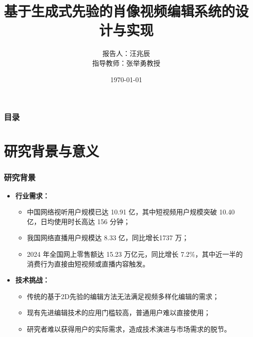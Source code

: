 \documentclass[aspectratio=169]{ctexbeamer}
\title[基于生成式先验的肖像视频编辑系统的设计与实现]{
    基于生成式先验的肖像视频编辑系统的设计与实现
}
\author[汪兆辰]{报告人：汪兆辰\\指导教师：张举勇教授}
\institute[USTC]{
数学科学学院·计算与应用数学系
}
\date{\today}
\begin{document}

\maketitleframe
\begin{frame}%
	\frametitle{目录}%
	\tableofcontents[hideallsubsections]%
\end{frame}%

\section{研究背景与意义}
\begin{frame}
  \frametitle{研究背景}
  \begin{itemize}
    \item \textbf{行业需求：}
    \begin{itemize}
      \item 中国网络视听用户规模已达 10.91 亿，其中短视频用户规模突破 10.40 亿，日均使用时长高达 156 分钟；
      \item 我国网络直播用户规模达 8.33 亿，同比增长1737 万；
      \item 2024 年全国网上零售额达 15.23 万亿元，同比增长 7.2\%，其中近一半的消费行为直接由短视频或直播内容触发。
    \end{itemize}
    \item \textbf{技术挑战：}
    \begin{itemize}
      \item 传统的基于2D先验的编辑方法无法满足视频多样化编辑的需求；
      \item 现有先进编辑技术的应用门槛较高，普通用户难以直接使用；
      \item 研究者难以获得用户的实际需求，造成技术演进与市场需求的脱节。
    \end{itemize}
  \end{itemize}
\end{frame} 
\end{document}
